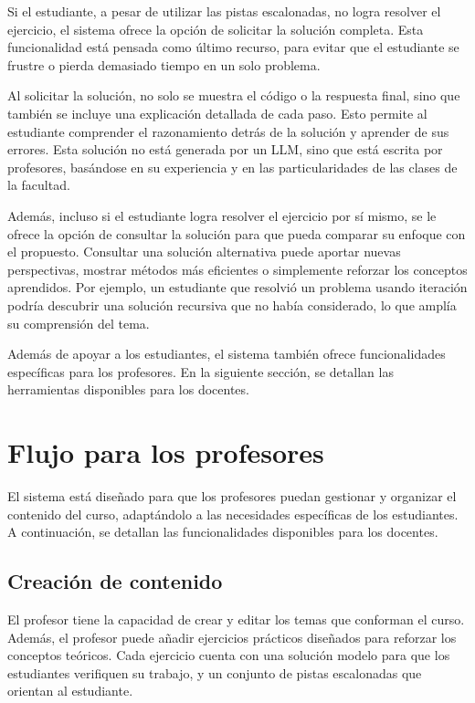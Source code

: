 Si el estudiante, a pesar de utilizar las pistas escalonadas, no logra resolver el ejercicio, el sistema ofrece la opción de solicitar la solución completa. Esta funcionalidad está pensada como último recurso, para evitar que el estudiante se frustre o pierda demasiado tiempo en un solo problema.

Al solicitar la solución, no solo se muestra el código o la respuesta final, sino que también se incluye una explicación detallada de cada paso. Esto permite al estudiante comprender el razonamiento detrás de la solución y aprender de sus errores. Esta solución no está generada por un LLM, sino que está escrita por profesores, basándose en su experiencia y en las particularidades de las clases de la facultad.

Además, incluso si el estudiante logra resolver el ejercicio por sí mismo, se le ofrece la opción de consultar la solución para que pueda comparar su enfoque con el propuesto. Consultar una solución alternativa puede aportar nuevas perspectivas, mostrar métodos más eficientes o simplemente reforzar los conceptos aprendidos. Por ejemplo, un estudiante que resolvió un problema usando iteración podría descubrir una solución recursiva que no había considerado, lo que amplía su comprensión del tema.

Además de apoyar a los estudiantes, el sistema también ofrece funcionalidades específicas para los profesores. En la siguiente sección, se detallan las herramientas disponibles para los docentes.

\section{Flujo para los profesores}\label{sec:teachers}

El sistema está diseñado para que los profesores puedan gestionar y organizar el contenido del curso, adaptándolo a las necesidades específicas de los estudiantes. A continuación, se detallan las funcionalidades disponibles para los docentes.

\subsection{Creación de contenido}

El profesor tiene la capacidad de crear y editar los temas que conforman el curso. Además, el profesor puede añadir ejercicios prácticos diseñados para reforzar los conceptos teóricos. Cada ejercicio cuenta con una solución modelo para que los estudiantes verifiquen su trabajo, y un conjunto de pistas escalonadas que orientan al estudiante.

